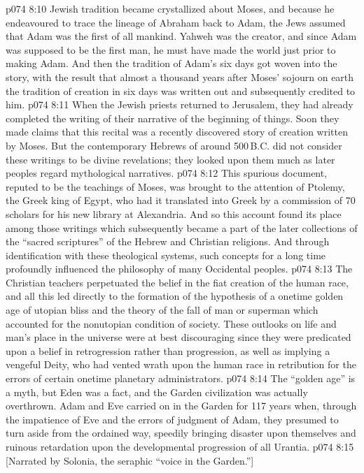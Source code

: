 \vs p074 8:10 Jewish tradition became crystallized about Moses, and because he endeavoured to trace the lineage of Abraham back to Adam, the Jews assumed that Adam was the first of all mankind. Yahweh was the creator, and since Adam was supposed to be the first man, he must have made the world just prior to making Adam. And then the tradition of Adam’s six days got woven into the story, with the result that almost a thousand years after Moses’ sojourn on earth the tradition of creation in six days was written out and subsequently credited to him.
\vs p074 8:11 When the Jewish priests returned to Jerusalem, they had already completed the writing of their narrative of the beginning of things. Soon they made claims that this recital was a recently discovered story of creation written by Moses. But the contemporary Hebrews of around 500\,B.C. did not consider these writings to be divine revelations; they looked upon them much as later peoples regard mythological narratives.
\vs p074 8:12 This spurious document, reputed to be the teachings of Moses, was brought to the attention of Ptolemy, the Greek king of Egypt, who had it translated into Greek by a commission of 70 scholars for his new library at Alexandria. And so this account found its place among those writings which subsequently became a part of the later collections of the “sacred scriptures” of the Hebrew and Christian religions. And through identification with these theological systems, such concepts for a long time profoundly influenced the philosophy of many Occidental peoples.
\vs p074 8:13 The Christian teachers perpetuated the belief in the fiat creation of the human race, and all this led directly to the formation of the hypothesis of a onetime golden age of utopian bliss and the theory of the fall of man or superman which accounted for the nonutopian condition of society. These outlooks on life and man’s place in the universe were at best discouraging since they were predicated upon a belief in retrogression rather than progression, as well as implying a vengeful Deity, who had vented wrath upon the human race in retribution for the errors of certain onetime planetary administrators.
\vs p074 8:14 \pc The “golden age” is a myth, but Eden was a fact, and the Garden civilization was actually overthrown. Adam and Eve carried on in the Garden for 117 years when, through the impatience of Eve and the errors of judgment of Adam, they presumed to turn aside from the ordained way, speedily bringing disaster upon themselves and ruinous retardation upon the developmental progression of all Urantia.
\vsetoff
\vs p074 8:15 [Narrated by Solonia, the seraphic “voice in the Garden.”]
\quizlink
